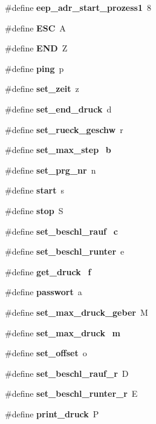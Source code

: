 \begin{DoxyCompactItemize}
\item 
\#define \textbf{ eep\+\_\+adr\+\_\+start\+\_\+prozess1}~8
\item 
\#define \textbf{ E\+SC}~\textquotesingle{}A\textquotesingle{}
\item 
\#define \textbf{ E\+ND}~\textquotesingle{}Z\textquotesingle{}
\item 
\#define \textbf{ ping}~\textquotesingle{}p\textquotesingle{}
\item 
\#define \textbf{ set\+\_\+zeit}~\textquotesingle{}z\textquotesingle{}
\item 
\#define \textbf{ set\+\_\+end\+\_\+druck}~\textquotesingle{}d\textquotesingle{}
\item 
\#define \textbf{ set\+\_\+rueck\+\_\+geschw}~\textquotesingle{}r\textquotesingle{}
\item 
\#define \textbf{ set\+\_\+max\+\_\+step}~\textquotesingle{}\textbf{ b}\textquotesingle{}
\item 
\#define \textbf{ set\+\_\+prg\+\_\+nr}~\textquotesingle{}n\textquotesingle{}
\item 
\#define \textbf{ start}~\textquotesingle{}s\textquotesingle{}
\item 
\#define \textbf{ stop}~\textquotesingle{}S\textquotesingle{}
\item 
\#define \textbf{ set\+\_\+beschl\+\_\+rauf}~\textquotesingle{}\textbf{ c}\textquotesingle{}
\item 
\#define \textbf{ set\+\_\+beschl\+\_\+runter}~\textquotesingle{}e\textquotesingle{}
\item 
\#define \textbf{ get\+\_\+druck}~\textquotesingle{}\textbf{ f}\textquotesingle{}
\item 
\#define \textbf{ passwort}~\textquotesingle{}a\textquotesingle{}
\item 
\#define \textbf{ set\+\_\+max\+\_\+druck\+\_\+geber}~\textquotesingle{}M\textquotesingle{}
\item 
\#define \textbf{ set\+\_\+max\+\_\+druck}~\textquotesingle{}\textbf{ m}\textquotesingle{}
\item 
\#define \textbf{ set\+\_\+offset}~\textquotesingle{}o\textquotesingle{}
\item 
\#define \textbf{ set\+\_\+beschl\+\_\+rauf\+\_\+r}~\textquotesingle{}D\textquotesingle{}
\item 
\#define \textbf{ set\+\_\+beschl\+\_\+runter\+\_\+r}~\textquotesingle{}E\textquotesingle{}
\item 
\#define \textbf{ print\+\_\+druck}~\textquotesingle{}P\textquotesingle{}

\end{DoxyCompactItemize}
